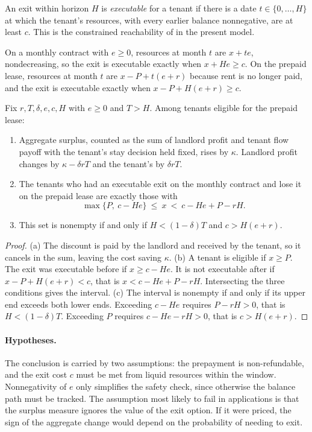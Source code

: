 \begin{definition}
An exit within horizon $H$ is \emph{executable} for a tenant if there is a date $t\in\{0,\dots,H\}$ at which the tenant's resources, with every earlier balance nonnegative, are at least $c$. This is the constrained reachability of  in the present model.
\end{definition}

On a monthly contract with $e\ge 0$, resources at month $t$ are $x+te$, nondecreasing, so the exit is executable exactly when $x+He\ge c$. On the prepaid lease, resources at month $t$ are $x-P+t(e+r)$ because rent is no longer paid, and the exit is executable exactly when $x-P+H(e+r)\ge c$.

\begin{hthm}\label{thm:H1}
Fix $r,T,\delta,e,c,H$ with $e\ge 0$ and $T>H$. Among tenants eligible for the prepaid lease:
\begin{enumerate}[label=(\alph*),leftmargin=2em]
\item Aggregate surplus, counted as the sum of landlord profit and tenant flow payoff with the tenant's stay decision held fixed, rises by $\kappa$. Landlord profit changes by $\kappa-\delta rT$ and the tenant's by $\delta rT$.
\item The tenants who had an executable exit on the monthly contract and lose it on the prepaid lease are exactly those with
\[
\max\{P,\ c-He\}\ \le\ x\ <\ c-He+P-rH.
\]
\item This set is nonempty if and only if $H<(1-\delta)T$ and $c>H(e+r)$.
\end{enumerate}
\end{hthm}

\begin{proof}
(a) The discount is paid by the landlord and received by the tenant, so it cancels in the sum, leaving the cost saving $\kappa$. (b) A tenant is eligible if $x\ge P$. The exit was executable before if $x\ge c-He$. It is not executable after if $x-P+H(e+r)<c$, that is $x<c-He+P-rH$. Intersecting the three conditions gives the interval. (c) The interval is nonempty if and only if its upper end exceeds both lower ends. Exceeding $c-He$ requires $P-rH>0$, that is $H<(1-\delta)T$. Exceeding $P$ requires $c-He-rH>0$, that is $c>H(e+r)$.
\end{proof}

\paragraph{Hypotheses.} The conclusion is carried by two assumptions: the prepayment is non-refundable, and the exit cost $c$ must be met from liquid resources within the window. Nonnegativity of $e$ only simplifies the safety check, since otherwise the balance path must be tracked. The assumption most likely to fail in applications is that the surplus measure ignores the value of the exit option. If it were priced, the sign of the aggregate change would depend on the probability of needing to exit.

